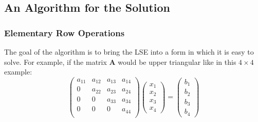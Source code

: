 

\subsection{An Algorithm for the Solution}

\subsubsection{Elementary Row Operations}
The goal of the algorithm is to bring the LSE into a form in which it is easy to solve. For example, if the matrix $\mathbf{A}$ would be upper triangular like in this $4 \times 4$ example:
\begin{equation}
\begin{pmatrix}
a_{11} & a_{12} & a_{13} & a_{14} \\
 0     & a_{22} & a_{23} & a_{24} \\
 0     &   0    & a_{33} & a_{34} \\ 
 0     &   0    &    0   & a_{44} \\ 
\end{pmatrix}
\begin{pmatrix}
x_1 \\ x_2 \\ x_3 \\ x_4 
\end{pmatrix}
=
\begin{pmatrix}
b_1 \\ b_2 \\ b_3 \\ b_4 
\end{pmatrix}
\end{equation}




\begin{comment}

-"Algebra" is generally about solving equations. Questions liek: 
 -How many solutions are there?
 -How can we find them? Is there a systematic algorithm to produce the solutions?
 -Is there some structure to the set of solutions.
  -In case of linear algebra: the structure of the solution set of a linear system of equations is:
   x_g = x_p + x_h where: x_g is the general solution, y_p is a particular solution and y_h is the
   homogeneous solution. The latter is a subspace of the space we are seeking solutions in that is 
   given by the solution of the corresponding
   

\end{comment}